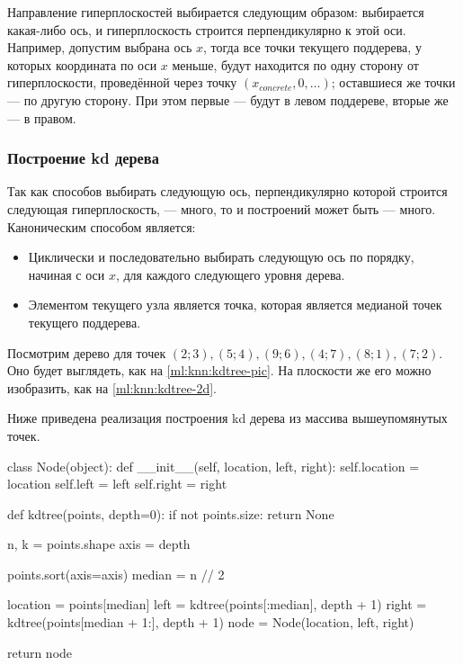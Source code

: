 Направление гиперплоскостей выбирается следующим образом: выбирается какая-либо ось, и гиперплоскость строится перпендикулярно к этой оси. Например, допустим выбрана ось $x$, тогда все точки текущего поддерева, у которых координата по оси $x$ меньше, будут находится по одну сторону от гиперплоскости, проведённой через точку $(x_{concrete}, 0, \dots)$; оставшиеся же точки — по другую сторону. При этом первые — будут в левом поддереве, вторые же — в правом.

\subsubsection{Построение kd дерева}
Так как способов выбирать следующую ось, перпендикулярно которой строится следующая гиперплоскость, — много, то и построений может быть — много. Каноническим способом является:
\begin{itemize}
  \item Циклически и последовательно выбирать следующую ось по порядку, начиная с оси $x$, для каждого следующего уровня дерева.
  \item Элементом текущего узла является точка, которая является медианой точек текущего поддерева.
\end{itemize}

Посмотрим дерево для точек $(2; 3), (5; 4), (9; 6), (4; 7), (8; 1), (7; 2)$. Оно будет выглядеть, как на \autoref{ml:knn:kdtree-pic}. На плоскости же его можно изобразить, как на \autoref{ml:knn:kdtree-2d}.

Ниже приведена реализация построения kd дерева из массива вышеупомянутых точек.

\begin{pylst}{}{}
class Node(object):
    def __init__(self, location, left, right):
        self.location = location
        self.left = left
        self.right = right

def kdtree(points, depth=0):
    if not points.size:
        return None

    n, k = points.shape
    axis = depth %

    points.sort(axis=axis)
    median = n // 2

    location = points[median]
    left = kdtree(points[:median], depth + 1)
    right = kdtree(points[median + 1:], depth + 1)
    node = Node(location, left, right)

    return node
\end{pylst}

